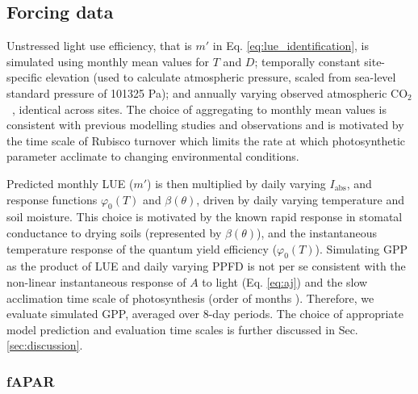 \documentclass{myreport}
\newcommand{\coo}{CO$_2$}
\begin{document}

\subsection{Forcing data}
\label{sec:forcingdata}

Unstressed light use efficiency, that is $m'$ in Eq. \ref{eq:lue_identification}, is simulated using monthly mean values for $T$ and $D$; temporally constant site-specific elevation (used to calculate atmospheric pressure, scaled from sea-level standard pressure of 101325 Pa); and annually varying observed atmospheric \coo\ \citep{MacFarlingMeure2006}, identical across sites. The choice of aggregating to monthly mean values is consistent with previous modelling studies \cite{maire12po} and observations \citep{suzuki01} and is motivated by the time scale of Rubisco turnover which limits the rate at which photosynthetic parameter acclimate to changing environmental conditions.

Predicted monthly LUE ($m'$) is then multiplied by daily varying $I_\text{abs}$, and response functions $\varphi_0(T)$ and $\beta(\theta)$, driven by daily varying temperature and soil moisture. This choice is motivated by the known rapid response in stomatal conductance to drying soils (represented by $\beta(\theta)$), and the instantaneous temperature response of the quantum yield efficiency ($\varphi_0(T)$). Simulating GPP as the product of LUE and daily varying PPFD is not per se consistent with the non-linear instantaneous response of $A$ to light (Eq. \ref{eq:aj}) and the slow acclimation time scale of photosynthesis (order of months \citep{suzuki01, maire12po}). Therefore, we evaluate simulated GPP, averaged over 8-day periods. The choice of appropriate model prediction and evaluation time scales is further discussed in Sec. \ref{sec:discussion}.  

\subsubsection{fAPAR}
\label{sec:greennessdata}
\end{document}
